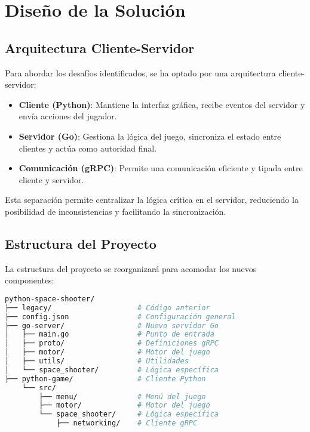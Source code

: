 \documentclass[12pt,letterpaper]{article}
\begin{document}
\section{Diseño de la Solución}

\subsection{Arquitectura Cliente-Servidor}

Para abordar los desafíos identificados, se ha optado por una arquitectura cliente-servidor:

\begin{itemize}
    \item \textbf{Cliente (Python)}: Mantiene la interfaz gráfica, recibe eventos del servidor y envía acciones del jugador.
    \item \textbf{Servidor (Go)}: Gestiona la lógica del juego, sincroniza el estado entre clientes y actúa como autoridad final.
    \item \textbf{Comunicación (gRPC)}: Permite una comunicación eficiente y tipada entre cliente y servidor.
\end{itemize}

Esta separación permite centralizar la lógica crítica en el servidor, reduciendo la posibilidad de inconsistencias y facilitando la sincronización.

\subsection{Estructura del Proyecto}

La estructura del proyecto se reorganizará para acomodar los nuevos componentes:

\begin{lstlisting}[language=bash, caption=Estructura de carpetas del proyecto]
python-space-shooter/
├── legacy/                    # Código anterior
├── config.json                # Configuración general
├── go-server/                 # Nuevo servidor Go
│   ├── main.go                # Punto de entrada
│   ├── proto/                 # Definiciones gRPC
│   ├── motor/                 # Motor del juego
│   ├── utils/                 # Utilidades
│   └── space_shooter/         # Lógica específica
├── python-game/               # Cliente Python
    └── src/
        ├── menu/              # Menú del juego
        ├── motor/             # Motor del juego
        └── space_shooter/     # Lógica específica
            ├── networking/    # Cliente gRPC
\end{lstlisting}
\end{document}

